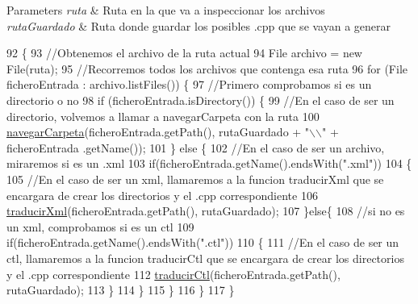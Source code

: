 \begin{DoxyParams}{Parameters}
{\em ruta} & Ruta en la que va a inspeccionar los archivos \\
\hline
{\em ruta\+Guardado} & Ruta donde guardar los posibles .cpp que se vayan a generar \\
\hline
\end{DoxyParams}

\begin{DoxyCode}
92                                                                  \{
93         \textcolor{comment}{//Obtenemos el archivo de la ruta actual}
94         File archivo = \textcolor{keyword}{new} File(ruta);
95         \textcolor{comment}{//Recorremos todos los archivos que contenga esa ruta}
96         \textcolor{keywordflow}{for} (File ficheroEntrada : archivo.listFiles()) \{
97             \textcolor{comment}{//Primero comprobamos si es un directorio o no}
98             \textcolor{keywordflow}{if} (ficheroEntrada.isDirectory()) \{
99                 \textcolor{comment}{//En el caso de ser un directorio, volvemos a llamar a navegarCarpeta con la ruta}
100                 \mbox{\hyperlink{classactualizadordoxy_1_1_actualizador_doxy_af4668210418bc7f9f1d6b8786891678b}{navegarCarpeta}}(ficheroEntrada.getPath(), rutaGuardado + \textcolor{stringliteral}{"\(\backslash\)\(\backslash\)"} + ficheroEntrada
      .getName());
101             \} \textcolor{keywordflow}{else} \{
102                 \textcolor{comment}{//En el caso de ser un archivo, miraremos si es un .xml}
103                 \textcolor{keywordflow}{if}(ficheroEntrada.getName().endsWith(\textcolor{stringliteral}{".xml"}))
104                 \{
105                     \textcolor{comment}{//En el caso de ser un xml, llamaremos a la funcion traducirXml que se encargara de
       crear los directorios y el .cpp correspondiente}
106                     \mbox{\hyperlink{classactualizadordoxy_1_1_actualizador_doxy_a598c7f1543ae3cf3f24b3fabcf2ad204}{traducirXml}}(ficheroEntrada.getPath(), rutaGuardado);
107                 \}\textcolor{keywordflow}{else}\{
108                     \textcolor{comment}{//si no es un xml, comprobamos si es un ctl}
109                     \textcolor{keywordflow}{if}(ficheroEntrada.getName().endsWith(\textcolor{stringliteral}{".ctl"}))
110                     \{
111                         \textcolor{comment}{//En el caso de ser un ctl, llamaremos a la funcion traducirCtl que se encargara de
       crear los directorios y el .cpp correspondiente}
112                         \mbox{\hyperlink{classactualizadordoxy_1_1_actualizador_doxy_a0a365e6e69bfc823f8ac8eea0e348c04}{traducirCtl}}(ficheroEntrada.getPath(), rutaGuardado);
113                     \}
114                 \}
115             \}
116         \}
117     \}
\end{DoxyCode}
\mbox{\label{classactualizadordoxy_1_1_actualizador_doxy_a483f64d7ea713784694962feed55f4f4}} 
